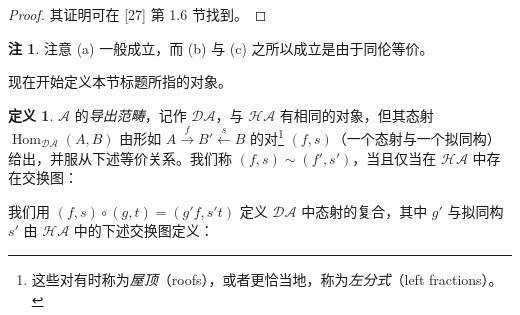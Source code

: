 \documentclass[11pt,a4paper]{article}
\theoremstyle{plain}
\theoremstyle{definition}
\newtheorem{definition}[theorem]{定义}
\newtheorem{remark}[theorem]{注}
\begin{document}
\begin{proof}
其证明可在 [27] 第 1.6 节找到。
\end{proof}

\begin{remark}
注意 (a) 一般成立，而 (b) 与 (c) 之所以成立是由于同伦等价。
\end{remark}

现在开始定义本节标题所指的对象。

\begin{definition}
$\mathcal{A}$ 的\emph{导出范畴}，记作 $\mathcal{D}\mathcal{A}$，与 $\mathcal{H}\mathcal{A}$ 有相同的对象，但其态射 $\operatorname{Hom}_{\mathcal{D}\mathcal{A}}(A,B)$ 由形如 $A\xrightarrow{f}B'\xleftarrow{s}B$ 的对\footnote{这些对有时称为\emph{屋顶}（roofs），或者更恰当地，称为\emph{左分式}（left fractions）。} $(f,s)$（一个态射与一个拟同构）给出，并服从下述等价关系。我们称 $(f,s)\sim(f',s')$，当且仅当在 $\mathcal{H}\mathcal{A}$ 中存在交换图：

我们用 $(f,s)\circ(g,t)=(g'f,s't)$ 定义 $\mathcal{D}\mathcal{A}$ 中态射的复合，其中 $g'$ 与拟同构 $s'$ 由 $\mathcal{H}\mathcal{A}$ 中的下述交换图定义：
\end{definition}
\end{document}
